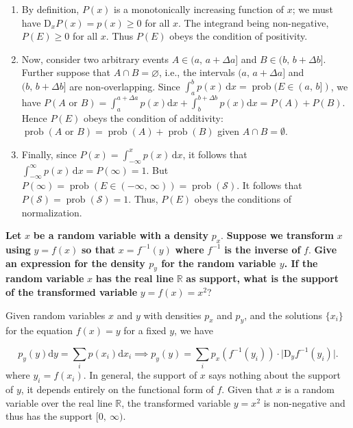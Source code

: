 \documentclass[11pt]{article}
\begin{document}
\begin{enumerate}
\item By definition, \(P(x)\) is a monotonically increasing function of \(x\); we must have \(\mathrm{D}_{x} P(x) = p(x) \geq 0\) for all \(x\). The integrand being non-negative, \(P(E) \geq 0\) for all \(x\). Thus \(P(E)\) obeys the condition of positivity.

\item Now, consider two arbitrary events \(A \in (a,\, a + \Delta a]\) and \(B \in (b,\, b + \Delta b]\). Further suppose that \(A \cap B = \varnothing\), i.e., the intervals \((a, \, a+ \Delta a]\) and \((b, \, b + \Delta b]\) are non-overlapping. Since \(\int_{a}^{b} p(x) \, \mathrm{d}x = \operatorname{prob} (E \in (a, \, b])\), we have \(P(A \text{ or } B) = \int_{a}^{a + \Delta a} p(x) \mathrm{d}x + \int_{b}^{b + \Delta b} p(x) \mathrm{d}x = P(A) + P(B)\). Hence \(P(E)\) obeys the condition of additivity: \(\operatorname{prob} (A \text{ or } B) = \operatorname{prob}(A) + \operatorname{prob}(B)\) given \(A \cap B = \emptyset\).

\item Finally, since \(P(x) = \int_{-\infty}^{x} p(x) \, \mathrm{d}x\), it follows that \(\int_{-\infty}^{\infty} p(x) \, \mathrm{d} x = P(\infty) = 1\). But \(P(\infty) = \operatorname{prob} (E \in(-\infty, \, \infty)) =  \operatorname{prob}(\mathcal{S})\). It follows that \(P(\mathcal{S}) = \operatorname{prob} (\mathcal{S})  = 1\). Thus, \(P(E)\) obeys the conditions of normalization.
\end{enumerate}
\label{sec:org12cdb71}
\textbf{Let} \(x\) \textbf{be a random variable with a density} \(p_{x}\). \textbf{Suppose we transform} \(x\) \textbf{using} \(y = f(x)\) \textbf{so that} \(x = f^{-1}(y)\) \textbf{where} \(f^{-1}\) \textbf{is the inverse of} \(f\). \textbf{Give an expression for the density \(p_y\) for the random variable \(y\). If the random variable} \(x\) \textbf{has the real line} \(\mathbb{R}\) \textbf{as support, what is the support of the transformed variable} \(y = f(x) = x^{2}\)?

Given random variables \(x\) and \(y\) with densities \(p_{x}\) and \(p_{y}\), and the solutions \(\{x_{i}\}\) for the equation \(f(x) = y\) for a fixed \(y\), we have

\[
p_y (y) \mathrm{d} y = \sum_{i} p(x_{i}) \mathrm{d} x_{i} \implies p_y (y) = \sum_{i} p_{x} (f^{-1}(y_{i})) \cdot \lvert \mathrm{D}_{y} f^{-1}(y_{i}) \rvert.
\]
where \(y_{i} = f(x_{i})\). In general, the support of \(x\) says nothing about the support of \(y\), it depends entirely on the functional form of \(f\). Given that \(x\) is a random variable over the real line \(\mathbb{R}\), the transformed variable \(y = x^{2}\) is non-negative and thus has the support \([0,~\infty)\).
\end{document}
